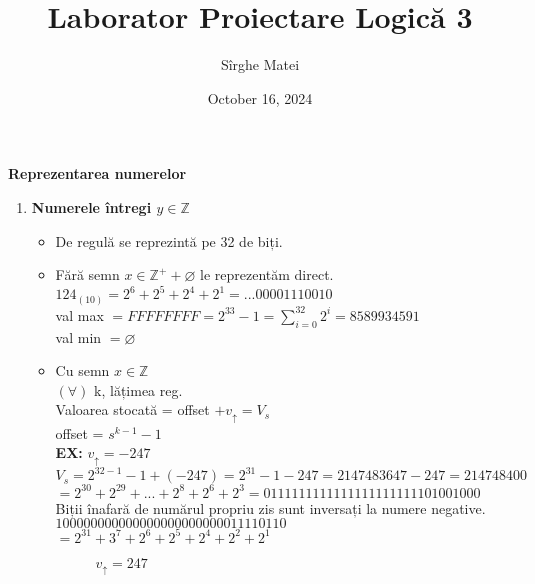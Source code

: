 \documentclass[12pt]{article}
\title{\bfseries Laborator Proiectare Logică 3}
\author{Sîrghe Matei}
\date{October 16, 2024}
\begin{document}
\maketitle

\begin{center}
    \large \textbf{Reprezentarea numerelor}
\end{center}

\begin{enumerate}[label=(\alph*)]
    \item { \textbf{Numerele întregi $ y \in \mathbb{Z} $}
        \begin{itemize}
            \item De regulă se reprezintă pe 32 de biți.
            \item { Fără semn $ x \in \mathbb{Z^{+}}+{\varnothing}$ le reprezentăm direct.\\
            $ 124_{(10)}=2^{6}+2^{5}+2^{4}+2^{1}=...00001110010 $\\
            val max $= FFFFFFFF=2^{33}-1 = \sum_{i=0}^{32}2^{i}=8589934591$\\
            val min $= \varnothing $
            }
            \item {Cu semn $ x \in \mathbb{Z}$\\
            $(\forall)$ k, lățimea reg.\\
            Valoarea stocată = offset $+ v_{\uparrow}=V_{s}$\\
            offset = $s^{k-1}-1$\\
            \textbf{EX:} $ v_{\uparrow} = -247 $\\
            $ V_{s}=2^{32-1}-1+(-247) = 2^{31}-1-247 =2147483647-247=214748400 $\\
            $ = 2^30+2^29+...+2^8+2^6+2^3=0111111111111111111111101001000$\\
            Biții înafară de numărul propriu zis sunt inversați la numere negative.\\
            $100000000000000000000000011110110$\\
            $=2^31+3^7+2^6+2^5+2^4+2^2+2^1$\\
            
            \begin{figure}[h!]
                \begin{minipage}{0.5\textwidth}
                    \hspace{2cm} $ v_{\uparrow}=247$
                \end{minipage}
                \hfill
                \begin{minipage}{0.4\textwidth}
\end{minipage}
\end{figure}}
\end{itemize}}
\end{enumerate}
\end{document}
